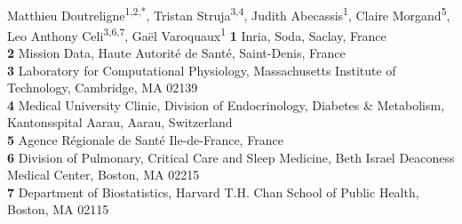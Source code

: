 \documentclass[10pt,letterpaper]{article}
\begin{document}
\vspace*{0.2in}

\begin{flushleft}
    {\Large
        \textbf{} %
    }
    \newline
    \\
    Matthieu Doutreligne\textsuperscript{1,2,*},
    Tristan Struja\textsuperscript{3,4},
    Judith Abecassis\textsuperscript{1},
    Claire Morgand\textsuperscript{5},
    Leo Anthony Celi\textsuperscript{3,6,7},
    Gaël Varoquaux\textsuperscript{1}
    \bigskip
    \textbf{1} Inria, Soda, Saclay, France
    \\
    \textbf{2} Mission Data, Haute Autorité de Santé, Saint-Denis, France
    \\
    \textbf{3} Laboratory for Computational Physiology, Massachusetts Institute of Technology, Cambridge, MA 02139
    \\
    \textbf{4} Medical University Clinic, Division of Endocrinology, Diabetes \& Metabolism, Kantonsspital Aarau, Aarau, Switzerland
    \\
    \textbf{5} Agence Régionale de Santé Ile-de-France, France
    \\
    \textbf{6} Division of Pulmonary, Critical Care and Sleep Medicine, Beth Israel Deaconess Medical Center, Boston, MA 02215
    \\
    \textbf{7} Department of Biostatistics, Harvard T.H. Chan School of Public Health, Boston, MA 02115
    \bigskip







\end{flushleft}
\end{document}
